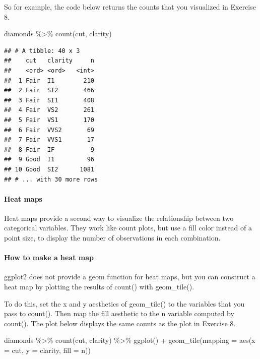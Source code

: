 \documentclass[
]{article}
\newenvironment{Shaded}{\begin{snugshade}}{\end{snugshade}}
\newcommand{\AttributeTok}[1]{\textcolor[rgb]{0.77,0.63,0.00}{#1}}
\newcommand{\FunctionTok}[1]{\textcolor[rgb]{0.00,0.00,0.00}{#1}}
\newcommand{\NormalTok}[1]{#1}
\newcommand{\SpecialCharTok}[1]{\textcolor[rgb]{0.00,0.00,0.00}{#1}}
\begin{document}
So for example, the code below returns the counts that you visualized in
Exercise 8.

\begin{Shaded}
\begin{Highlighting}[]
\NormalTok{diamonds }\SpecialCharTok{\%\textgreater{}\%} 
   \FunctionTok{count}\NormalTok{(cut, clarity)}
\end{Highlighting}
\end{Shaded}

\begin{verbatim}
## # A tibble: 40 x 3
##    cut   clarity     n
##    <ord> <ord>   <int>
##  1 Fair  I1        210
##  2 Fair  SI2       466
##  3 Fair  SI1       408
##  4 Fair  VS2       261
##  5 Fair  VS1       170
##  6 Fair  VVS2       69
##  7 Fair  VVS1       17
##  8 Fair  IF          9
##  9 Good  I1         96
## 10 Good  SI2      1081
## # ... with 30 more rows
\end{verbatim}

\hypertarget{heat-maps}{%
\paragraph{Heat maps}\label{heat-maps}}

Heat maps provide a second way to visualize the relationship between two
categorical variables. They work like count plots, but use a fill color
instead of a point size, to display the number of observations in each
combination.

\hypertarget{how-to-make-a-heat-map}{%
\paragraph{How to make a heat map}\label{how-to-make-a-heat-map}}

ggplot2 does not provide a geom function for heat maps, but you can
construct a heat map by plotting the results of count() with
geom\_tile().

To do this, set the x and y aesthetics of geom\_tile() to the variables
that you pass to count(). Then map the fill aesthetic to the n variable
computed by count(). The plot below displays the same counts as the plot
in Exercise 8.

\begin{Shaded}
\begin{Highlighting}[]
\NormalTok{diamonds }\SpecialCharTok{\%\textgreater{}\%} 
   \FunctionTok{count}\NormalTok{(cut, clarity) }\SpecialCharTok{\%\textgreater{}\%} 
   \FunctionTok{ggplot}\NormalTok{() }\SpecialCharTok{+}
     \FunctionTok{geom\_tile}\NormalTok{(}\AttributeTok{mapping =} \FunctionTok{aes}\NormalTok{(}\AttributeTok{x =}\NormalTok{ cut, }\AttributeTok{y =}\NormalTok{ clarity, }\AttributeTok{fill =}\NormalTok{ n))}
\end{Highlighting}
\end{Shaded}
\end{document}
